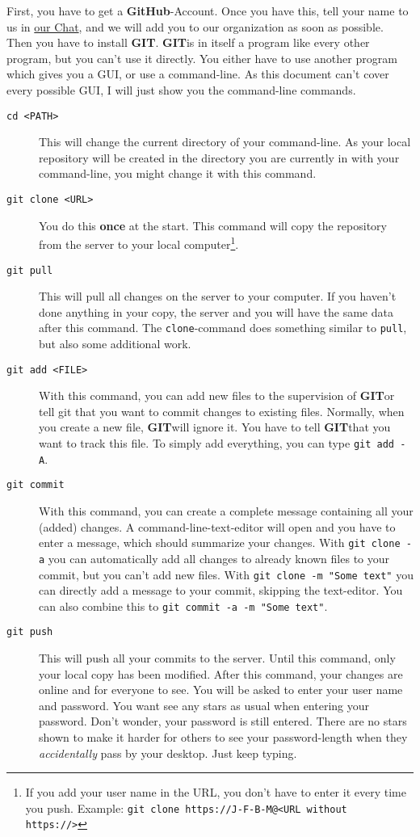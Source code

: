 \documentclass[a4paper]{article}
\newcommand{\git}{\textbf{GIT}}
\newcommand{\github}{\textbf{GitHub}}
\newcommand{\chatlink}{http://chat.stackexchange.com/rooms/17796/collaborative-shared-worlds}
\begin{document}
First, you have to get a \github -Account. Once you have this, tell your name to us in \href{\chatlink}{our Chat}, and we will add you to our organization as soon as possible.\\
Then you have to install \git . \git is in itself a program like every other program, but you can't use it directly. You either have to use another program which gives you a GUI, or use a command-line. As this document can't cover every possible GUI, I will just show you the command-line commands.

\begin{description}
	\item[\texttt{cd <PATH>}] This will change the current directory of your command-line. As your local repository will be created in the directory you are currently in with your command-line, you might change it with this command.
	\item[\texttt{git clone <URL>}] You do this \textbf{once} at the start. This command will copy the repository from the server to your local computer\footnote{If you add your user name in the URL, you don't have to enter it every time you push. Example: \texttt{git clone https://J-F-B-M@<URL without https://>}}. 
	\item[\texttt{git pull}] This will pull all changes on the server to your computer. If you haven't done anything in your copy, the server and you will have the same data after this command. The \texttt{clone}-command does something similar to \texttt{pull}, but also some additional work.
	\item[\texttt{git add <FILE>}] With this command, you can add new files to the supervision of \git or tell git that you want to commit changes to existing files. Normally, when you create a new file, \git will ignore it. You have to tell \git that you want to track this file. To simply add everything, you can type \texttt{git add -A}.
	\item[\texttt{git commit}] With this command, you can create a complete message containing all your (added) changes. A command-line-text-editor will open and you have to enter a message, which should summarize your changes. With \texttt{git clone -a} you can automatically add all changes to already known files to your commit, but you can't add new files. With \texttt{git clone -m "Some text"} you can directly add a message to your commit, skipping the text-editor. You can also combine this to \texttt{git commit -a -m "Some text"}.
	\item[\texttt{git push}] This will push all your commits to the server. Until this command, only your local copy has been modified. After this command, your changes are online and for everyone to see. You will be asked to enter your user name and password. You want see any stars as usual when entering your password. Don't wonder, your password is still entered. There are no stars shown to make it harder for others to see your password-length when they \textit{accidentally} pass by your desktop. Just keep typing.
\end{description}
\end{document}

